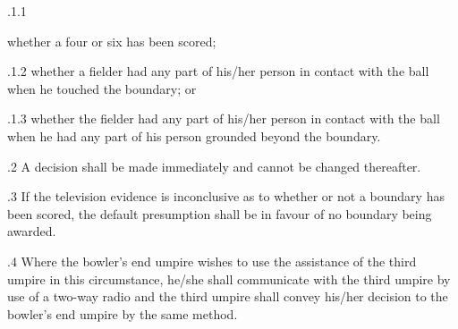 \documentclass[12pt]{article}
\begin{document}
\vspace{\baselineskip}
\begin{adjustwidth}{0.49in}{0.0in}
{\fontsize{9pt}{10.8pt}.1.1 \tabto{1.17in} {\fontsize{8pt}{9.6pt}\selectfont whether a four or six has been scored;\par}\par}\par

\end{adjustwidth}


\vspace{\baselineskip}
\begin{adjustwidth}{1.18in}{0.24in}
{\fontsize{9pt}{10.8pt}.1.2 \tabto{1.17in} whether a fielder had any part of his/her person in contact with the ball when he touched the boundary; or\par}\par

\end{adjustwidth}


\vspace{\baselineskip}
\begin{adjustwidth}{1.18in}{0.1in}
{\fontsize{9pt}{10.8pt}.1.3 \tabto{1.17in} whether the fielder had any part of his/her person in contact with the ball when he had any part of his person grounded beyond the boundary.\par}\par

\end{adjustwidth}


\vspace{\baselineskip}
{\fontsize{9pt}{10.8pt}.2 \tabto{0.49in} A decision shall be made immediately and cannot be changed thereafter.\par}\par


\vspace{\baselineskip}
\begin{adjustwidth}{0.5in}{0.39in}
{\fontsize{9pt}{10.8pt}.3 \tabto{0.49in} If the television evidence is inconclusive as to whether or not a boundary has been scored, the default presumption shall be in favour of no boundary being awarded.\par}\par

\end{adjustwidth}


\vspace{\baselineskip}
\begin{adjustwidth}{0.5in}{0.03in}
\begin{justify}
{\fontsize{9pt}{10.8pt}.4 \tabto{0.49in} Where the bowler’s end umpire wishes to use the assistance of the third umpire in this circumstance, he/she shall communicate with the third umpire by use of a two-way radio and the third umpire shall convey his/her decision to the bowler’s end umpire by the same method.\par}
\end{justify}\par

\end{adjustwidth}
\end{document}
